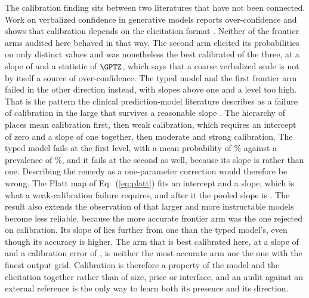 The calibration finding sits between two literatures that have not been connected. Work on verbalized confidence in generative models reports over-confidence \citep{xiong2024express} and shows that calibration depends on the elicitation format \citep{kadavath2022know,tian2023just}. Neither of the frontier arms audited
here behaved in that way. The second arm elicited its probabilities on only \GPTDistinctP{}
distinct values and was nonetheless the best calibrated of the three, at a slope of \GPTSlope{} and a
statistic of $\GPTZ$, which says that a coarse verbalized scale is not by itself a source of
over-confidence. The typed model and the first frontier arm failed in the other direction
instead, with slopes above one and a level too high. That is the pattern the clinical prediction-model literature describes as a failure
of calibration in the large that survives a reasonable slope
\citep{van2016a,steyerberg2010assessing}. The hierarchy of \citet{van2016a} places mean calibration first, then weak calibration, which
requires an intercept of zero and a slope of one together, then moderate and strong
calibration. The typed model fails at the first level, with a mean probability of
\GoldExpectedP\% against a prevalence of \GoldBaseRate\%, and it fails at the second as well,
because its slope is \GoldSlope{} rather than one. Describing the remedy as a one-parameter
correction would therefore be wrong. The Platt map of Eq.~(\ref{eq:platt}) fits an intercept
and a slope, which is what a weak-calibration failure requires, and after it the pooled slope
is \RecalPlattSlope{}. The result also extends the observation of \citet{zhou2024reliable} that larger and more
instructable models become less reliable, because the more accurate frontier arm was the one
rejected on calibration. Its slope of \FableSlope{} lies further from one than the typed
model's, even though its accuracy is higher. The arm that is best calibrated here, at a slope
of \GPTSlope{} and a calibration error of \GPTECE{}, is neither the most accurate arm nor the
one with the finest output grid. Calibration is therefore a property of the model and the
elicitation together rather than of size, price or interface, and an audit against an external
reference is the only way to learn both its presence and its direction.

